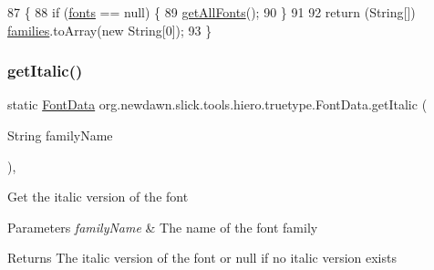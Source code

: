 \begin{DoxyCode}
87                                             \{
88         \textcolor{keywordflow}{if} (\mbox{\hyperlink{classorg_1_1newdawn_1_1slick_1_1tools_1_1hiero_1_1truetype_1_1_font_data_af5a135e5f654e01a6d82aa58a37d8b24}{fonts}} == null) \{
89             \mbox{\hyperlink{classorg_1_1newdawn_1_1slick_1_1tools_1_1hiero_1_1truetype_1_1_font_data_a24c78b670366c2eacffbf3b471d9d021}{getAllFonts}}();
90         \}
91         
92         \textcolor{keywordflow}{return} (String[]) \mbox{\hyperlink{classorg_1_1newdawn_1_1slick_1_1tools_1_1hiero_1_1truetype_1_1_font_data_a713c024899c48f71c123f2559bdd8ede}{families}}.toArray(\textcolor{keyword}{new} String[0]);
93     \}
\end{DoxyCode}
\mbox{\label{classorg_1_1newdawn_1_1slick_1_1tools_1_1hiero_1_1truetype_1_1_font_data_a4bbae81d0dffea2ffc4c43cbae8160b2}} 
\subsubsection{\texorpdfstring{get\+Italic()}{getItalic()}}
{\footnotesize\ttfamily static \mbox{\hyperlink{classorg_1_1newdawn_1_1slick_1_1tools_1_1hiero_1_1truetype_1_1_font_data}{Font\+Data}} org.\+newdawn.\+slick.\+tools.\+hiero.\+truetype.\+Font\+Data.\+get\+Italic (\begin{DoxyParamCaption}\item[{String}]{family\+Name }\end{DoxyParamCaption})\hspace{0.3cm}{\ttfamily [inline]}, {\ttfamily [static]}}

Get the italic version of the font


\begin{DoxyParams}{Parameters}
{\em family\+Name} & The name of the font family \\
\hline
\end{DoxyParams}
\begin{DoxyReturn}{Returns}
The italic version of the font or null if no italic version exists 
\end{DoxyReturn}

